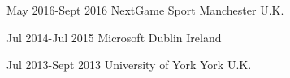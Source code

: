 \documentclass[10pt]{CurriculumVitae}
\begin{document}
      {May 2016-Sept 2016}
      {NextGame Sport} 
      {Manchester}
      {U.K.}
      {
      }
  
      {Jul 2014-Jul 2015}
      {Microsoft} 
      {Dublin}
      {Ireland}
      {
      }
    
      {Jul 2013-Sept 2013}
      {University of York}
      {York}
      {U.K.}
      {
      } 
\end{document}
